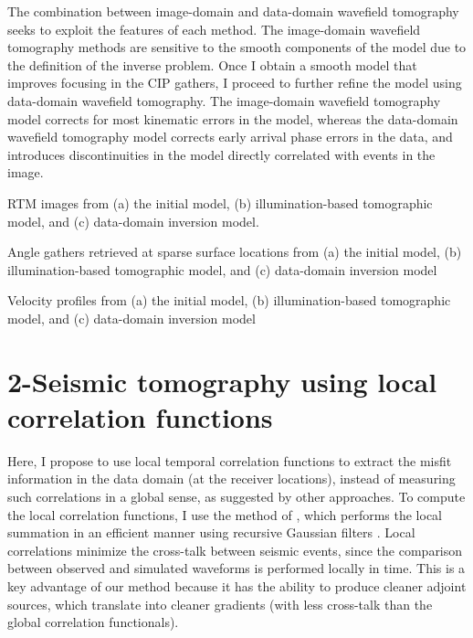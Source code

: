 The combination between image-domain and data-domain wavefield
tomography seeks to exploit the features of each method. The image-domain 
wavefield tomography methods are sensitive to the smooth components
of the model due to the definition of the inverse problem. Once I obtain
 a smooth model that improves focusing in the CIP gathers,
 I proceed to further refine the model using data-domain
 wavefield tomography. The image-domain wavefield tomography
model corrects for most kinematic errors in the model, 
whereas
the data-domain wavefield tomography model 
corrects early arrival phase errors in the data, and
introduces  discontinuities in the model directly correlated with events in 
the image.






%
{RTM images from (a) the initial model, (b) illumination-based tomographic model, and (c) data-domain inversion model.}



%
{Angle gathers retrieved at sparse surface locations from (a) the initial model, (b) illumination-based tomographic model, and (c) data-domain inversion model}



%
{Velocity profiles from (a) the initial model, (b) illumination-based tomographic model, and (c) data-domain inversion model}







\newpage
\section{2-Seismic tomography using local correlation functions }
Here, I propose to use local
temporal correlation functions to extract the misfit information in the data
domain (at the receiver locations), instead of measuring such correlations
in a global sense, as suggested by other approaches. To compute the local
correlation functions, I use the method of \cite{hale2006}, which performs
the local summation in an efficient manner using recursive Gaussian filters
\citep{hale2006recursive}. Local correlations minimize the cross-talk between
seismic events, since the comparison between observed and simulated waveforms
is performed locally in time. This is a key advantage of our method because
it has the ability to produce cleaner adjoint sources, which translate
into cleaner gradients (with less cross-talk than the global correlation
functionals).






